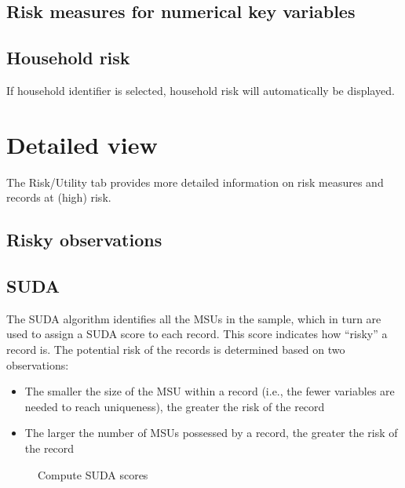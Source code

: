 \documentclass[letterpaper,10pt,english]{sphinxmanual}
\begin{document}
\subsection{Risk measures for numerical key variables}
\label{\detokenize{risk:risk-measures-for-numerical-key-variables}}

\subsection{Household risk}
\label{\detokenize{risk:household-risk}}
If household identifier is selected, household risk will automatically be displayed.


\section{Detailed view}
\label{\detokenize{risk:detailed-view}}
The Risk/Utility tab provides more detailed information on risk measures and records at
(high) risk.


\subsection{Risky observations}
\label{\detokenize{risk:risky-observations}}

\subsection{SUDA}
\label{\detokenize{risk:suda}}
The SUDA algorithm identifies all the MSUs in the sample, which in turn
are used to assign a SUDA score to each record. This score indicates how
“risky” a record is. The potential risk of the records is determined
based on two observations:
\begin{itemize}
\item {} 
The smaller the size of the MSU within a record (i.e., the fewer
variables are needed to reach uniqueness), the greater the risk of
the record

\item {} 
The larger the number of MSUs possessed by a record, the greater the
risk of the record

\end{itemize}

\begin{figure}[htbp]
\centering
\capstart

\noindent{}
\caption{Compute SUDA scores}\label{\detokenize{risk:id1}}\label{\detokenize{risk:id3}}\end{figure}
\end{document}
